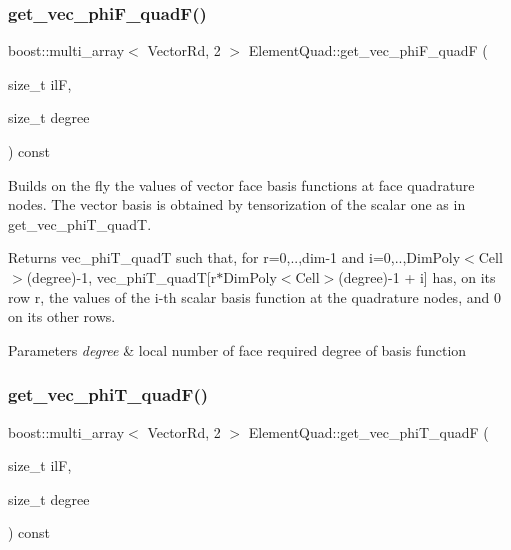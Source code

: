 \subsubsection{\texorpdfstring{get\+\_\+vec\+\_\+phi\+F\+\_\+quad\+F()}{get\_vec\_phiF\_quadF()}}
{\footnotesize\ttfamily boost\+::multi\+\_\+array$<$ Vector\+Rd, 2 $>$ Element\+Quad\+::get\+\_\+vec\+\_\+phi\+F\+\_\+quadF (\begin{DoxyParamCaption}\item[{size\+\_\+t}]{ilF,  }\item[{size\+\_\+t}]{degree }\end{DoxyParamCaption}) const}



Builds on the fly the values of vector face basis functions at face quadrature nodes. The vector basis is obtained by tensorization of the scalar one as in get\+\_\+vec\+\_\+phi\+T\+\_\+quadT. 

\begin{DoxyReturn}{Returns}
vec\+\_\+phi\+T\+\_\+quadT such that, for r=0,..,dim-\/1 and i=0,..,Dim\+Poly$<$\+Cell$>$(degree)-\/1, vec\+\_\+phi\+T\+\_\+quadT\mbox{[}r$\ast$\+Dim\+Poly$<$\+Cell$>$(degree)-\/1 + i\mbox{]} has, on its row r, the values of the i-\/th scalar basis function at the quadrature nodes, and 0 on its other rows. 
\end{DoxyReturn}

\begin{DoxyParams}{Parameters}
{\em degree} & local number of face required degree of basis function \\
\hline
\end{DoxyParams}
\mbox{\label{classHArDCore3D_1_1ElementQuad_ad470965a0f66f62c1ffed045e2dd49fc}} 
\subsubsection{\texorpdfstring{get\+\_\+vec\+\_\+phi\+T\+\_\+quad\+F()}{get\_vec\_phiT\_quadF()}}
{\footnotesize\ttfamily boost\+::multi\+\_\+array$<$ Vector\+Rd, 2 $>$ Element\+Quad\+::get\+\_\+vec\+\_\+phi\+T\+\_\+quadF (\begin{DoxyParamCaption}\item[{size\+\_\+t}]{ilF,  }\item[{size\+\_\+t}]{degree }\end{DoxyParamCaption}) const}



